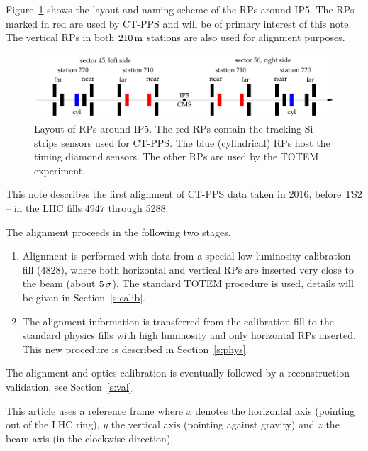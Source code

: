 \documentclass[TOTEM]{cern/cernphprep}
\def\un#1{\,{\rm #1}}
\begin{document}
Figure~\ref{fig:rp_layout} shows the layout and naming scheme \cite{rp-names} of the RPs around IP5. The RPs marked in red are used by CT-PPS and will be of primary interest of this note. The vertical RPs in both $210\un{m}$ stations are also used for alignment purposes.

\begin{figure}[h!]
\begin{center}
\includegraphics{fig/rp_layout.pdf}
\caption{%
Layout of RPs around IP5. The red RPs contain the tracking Si strips sensors used for CT-PPS. The blue (cylindrical) RPs host the timing diamond sensors. The other RPs are used by the TOTEM experiment.
}
\label{fig:rp_layout}
\end{center}
\end{figure}

This note describes the first alignment of CT-PPS data taken in 2016, before TS2 -- in the LHC fills 4947 through 5288. 

The alignment proceeds in the following two stages.
\begin{enumerate}[nosep]
\item Alignment is performed with data from a special low-luminosity calibration fill (4828), where both horizontal and vertical RPs are inserted very close to the beam (about $5\un{\sigma}$). The standard TOTEM procedure \cite{totem-ijmp} is used, details will be given in Section~\ref{s:calib}.
\item The alignment information is transferred from the calibration fill to the standard physics fills with high luminosity and only horizontal RPs inserted. This new procedure is described in Section~\ref{s:phys}.
\end{enumerate}

The alignment and optics calibration \cite{optics_calibration} is eventually followed by a reconstruction validation, see Section~\ref{s:val}.

This article uses a reference frame where $x$ denotes the horizontal axis (pointing out of the LHC ring), $y$ the vertical axis (pointing against gravity) and $z$ the beam axis (in the clockwise direction).


\end{document}
